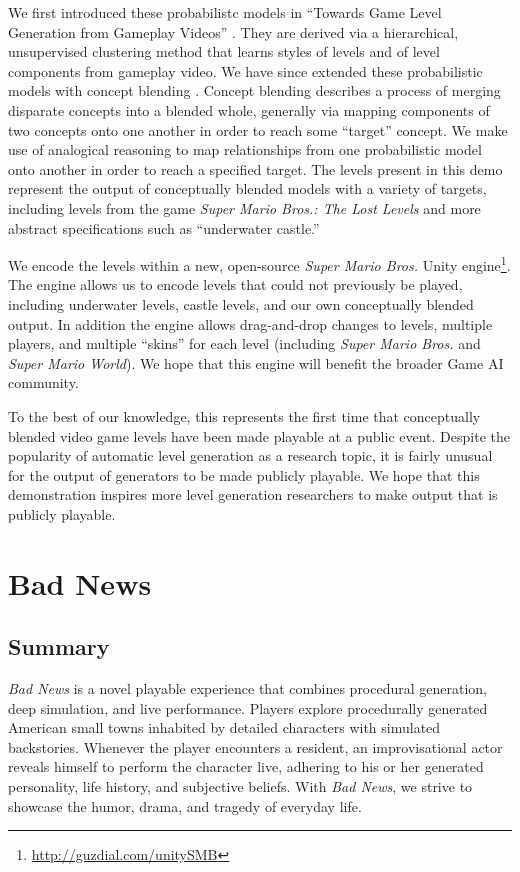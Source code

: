 \documentclass[letterpaper]{article}
\begin{document}
We first introduced these probabilistc models in ``Towards Game Level Generation from Gameplay Videos'' \cite{guzdial2015:video-level-gen}.
They are derived via a hierarchical, unsupervised clustering method that learns styles of levels and of level components from gameplay video.
We have since extended these probabilistic models with concept blending \cite{guzdial2016:mario-blend}.
Concept blending describes a process of merging disparate concepts into a blended whole, generally via mapping components of two concepts onto one another in order to reach some ``target'' concept.
We make use of analogical reasoning to map relationships from one probabilistic model onto another in order to reach a specified target.
The levels present in this demo represent the output of conceptually blended models with a variety of targets, including levels from the game \textit{Super Mario Bros.: The Lost Levels} and more abstract specifications such as ``underwater castle.''

We encode the levels within a new, open-source \textit{Super Mario Bros.} Unity engine\footnote{\url{http://guzdial.com/unitySMB}}.
The engine allows us to encode levels that could not previously be played, including underwater levels, castle levels, and our own conceptually blended output.
In addition the engine allows drag-and-drop changes to levels, multiple players, and multiple ``skins'' for each level (including \textit{Super Mario Bros.} and \textit{Super Mario World}).
We hope that this engine will benefit the broader Game AI community.

To the best of our knowledge, this represents the first time that conceptually blended video game levels have been made playable at a public event.
Despite the popularity of automatic level generation as a research topic, it is fairly unusual for the output of generators to be made publicly playable.
We hope that this demonstration inspires more level generation researchers to make output that is publicly playable.


\section{Bad News}
\subsection{Summary}
\textit{Bad News} is a novel playable experience that combines procedural generation, deep simulation, and live performance. Players explore procedurally generated American small towns inhabited by detailed characters with simulated backstories. Whenever the player encounters a resident, an improvisational actor reveals himself to perform the character live, adhering to his or her generated personality, life history, and subjective beliefs. With \textit{Bad News}, we strive to showcase the humor, drama, and tragedy of everyday life.
\end{document}
